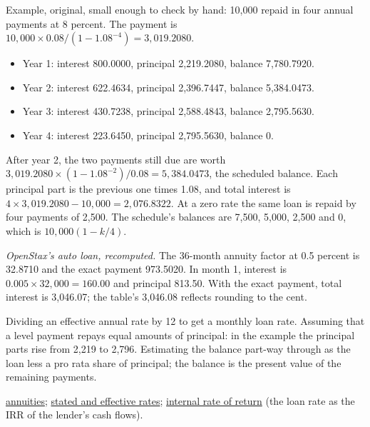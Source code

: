 \begin{qfmethod}
 Example, original, small enough to check by hand: 10{,}000 repaid in four annual payments at 8 percent. The payment is $10{,}000\times0.08/(1-1.08^{-4})=3{,}019.2080$.
\begin{itemize}
\item Year 1: interest 800.0000, principal 2{,}219.2080, balance 7{,}780.7920.
\item Year 2: interest 622.4634, principal 2{,}396.7447, balance 5{,}384.0473.
\item Year 3: interest 430.7238, principal 2{,}588.4843, balance 2{,}795.5630.
\item Year 4: interest 223.6450, principal 2{,}795.5630, balance 0.
\end{itemize}
After year 2, the two payments still due are worth $3{,}019.2080\times(1-1.08^{-2})/0.08=5{,}384.0473$, the scheduled balance. Each principal part is the previous one times 1.08, and total interest is $4\times3{,}019.2080-10{,}000=2{,}076.8322$. At a zero rate the same loan is repaid by four payments of 2{,}500. The schedule's balances are 7{,}500, 5{,}000, 2{,}500 and 0, which is $10{,}000(1-k/4)$.

\emph{OpenStax's auto loan, recomputed.} The 36-month annuity factor at 0.5 percent is 32.8710 and the exact payment 973.5020. In month 1, interest is $0.005\times32{,}000=160.00$ and principal 813.50. With the exact payment, total interest is 3{,}046.07; the table's 3{,}046.08 reflects rounding to the cent.

 Dividing an effective annual rate by 12 to get a monthly loan rate. Assuming that a level payment repays equal amounts of principal: in the example the principal parts rise from 2{,}219 to 2{,}796. Estimating the balance part-way through as the loan less a pro rata share of principal; the balance is the present value of the remaining payments.

 \hyperref[meth:cash-flow-streams]{annuities}; \hyperref[def:time-value-compounding]{stated and effective rates}; \hyperref[meth:internal-rate-of-return]{internal rate of return} (the loan rate as the IRR of the lender's cash flows).

\end{qfmethod}

